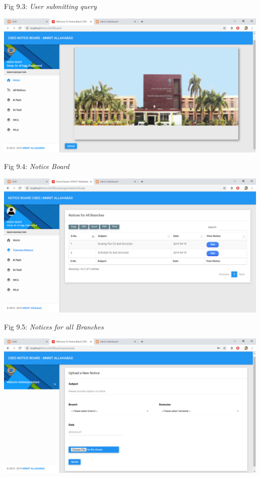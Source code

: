 \documentclass{mnnit}
\begin{document}
\begin{center}
Fig 9.3: \emph{User submitting query}
\end{center}
\includegraphics[width=\textwidth]{images/s4.png}
\begin{center}
Fig 9.4: \emph{Notice Board}
\end{center}
\includegraphics[width=\textwidth]{images/s5.png}
\begin{center}
Fig 9.5: \emph{Notices for all Branches}
\end{center}
\includegraphics[width=\textwidth]{images/s6.png}
\end{document}
